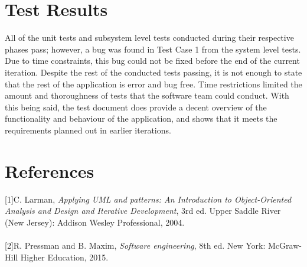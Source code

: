 \documentclass[12pt]{article}
\begin{document}
\section{Test Results}
All of the unit tests and subsystem level tests conducted during their respective phases pass; however, a bug was found in Test Case 1 from the system level tests. Due to time constraints, this bug could not be fixed before the end of the current iteration. Despite the rest of the conducted tests passing, it is not enough to state that the rest of the application is error and bug free. Time restrictions limited the amount and thoroughness of tests that the software team could conduct. With this being said, the test document does provide a decent overview of the functionality and behaviour of the application, and shows that it meets the requirements planned out in earlier iterations.

\section{References}

[1]C. Larman, \textit{Applying UML and patterns: An Introduction to Object-Oriented Analysis and Design and Iterative Development}, 3rd ed. Upper Saddle River (New Jersey): Addison Wesley Professional, 2004.\\\\

[2]R. Pressman and B. Maxim, \textit{Software engineering}, 8th ed. New York: McGraw-Hill Higher Education, 2015.
\end{document}
